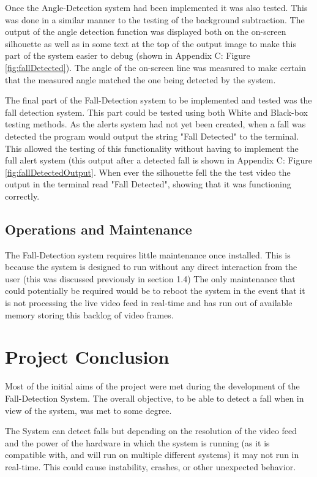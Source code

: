 \documentclass[11pt,a4paper]{report}
\begin{document}
Once the Angle-Detection system had been implemented it was also tested. This was done in a similar manner to the testing of the background subtraction. The output of the angle detection function was displayed both on the on-screen silhouette as well as in some text at the top of the output image to make this part of the system easier to debug (shown in Appendix C: Figure \ref{fig:fallDetected}). The angle of the on-screen line was measured to make certain that the measured angle matched the one being detected by the system.

The final part of the Fall-Detection system to be implemented and tested was the fall detection system. This part could be tested using both White and Black-box testing methods. As the alerts system had not yet been created, when a fall was detected the program would output the string "Fall Detected" to the terminal. This allowed the testing of this functionality without having to implement the full alert system (this output after a detected fall is shown in Appendix C: Figure \ref{fig:fallDetectedOutput}. When ever the silhouette fell the the test video the output in the terminal read "Fall Detected", showing that it was functioning correctly.

\section{Operations and Maintenance}

The Fall-Detection system requires little maintenance once installed. This is because the system is designed to run without any direct interaction from the user (this was discussed previously in section 1.4) The only maintenance that could potentially be required would be to reboot the system in the event that it is not processing the live video feed in real-time and has run out of available memory storing this backlog of video frames.

\chapter{Project Conclusion}

Most of the initial aims of the project were met during the development of the Fall-Detection System. The overall objective, to be able to detect a fall when in view of the system, was met to some degree.

The System can detect falls but depending on the resolution of the video feed and the power of the hardware in which the system is running (as it is compatible with, and will run on multiple different systems) it may not run in real-time. This could cause instability, crashes, or other unexpected behavior.
\end{document}
